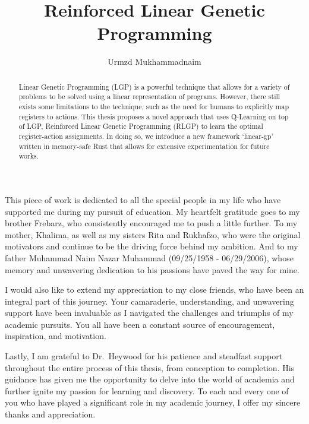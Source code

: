 \documentclass[12pt, final]{dalcsthesis}
\begin{document}
\bcshon
\title{Reinforced Linear Genetic Programming}
\author{Urmzd Mukhammadnaim}

\reader{}

\nolistoftables
\nolistoffigures

\frontmatter

\nocite{*}

\begin{abstract}
	Linear Genetic Programming (LGP) is a powerful technique that allows for a variety of problems to be solved using a linear representation of programs. However, there still exists some limitations to the technique, such as the need for humans to explicitly map registers to actions. This thesis proposes a novel approach that uses Q-Learning on top of LGP, Reinforced Linear Genetic Programming (RLGP) to learn the optimal register-action assignments. In doing so, we introduce a new framework `linear-gp' written in memory-safe Rust that allows for extensive experimentation for future works.
\end{abstract}

\begin{acknowledgements}
	This piece of work is dedicated to all the special people in my life who have supported me during my pursuit of education. My heartfelt gratitude goes to my brother Frebarz, who consistently encouraged me to push a little further. To my mother, Khalima, as well as my sisters Rita and Rukhafzo, who were the original motivators and continue to be the driving force behind my ambition. And to my father Muhammad Naim Nazar Muhammad (09/25/1958 - 06/29/2006), whose memory and unwavering dedication to his passions have paved the way for mine.

	I would also like to extend my appreciation to my close friends, who have been an integral part of this journey. Your camaraderie, understanding, and unwavering support have been invaluable as I navigated the challenges and triumphs of my academic pursuits. You all have been a constant source of encouragement, inspiration, and motivation.

	Lastly, I am grateful to Dr.\ Heywood for his patience and steadfast support throughout the entire process of this thesis, from conception to completion. His guidance has given me the opportunity to delve into the world of academia and further ignite my passion for learning and discovery. To each and every one of you who have played a significant role in my academic journey, I offer my sincere thanks and appreciation.
\end{acknowledgements}
\end{document}

